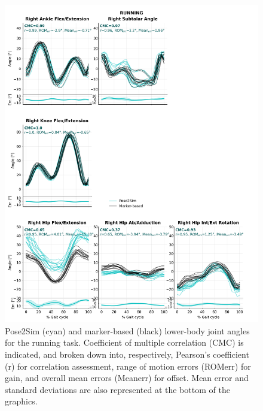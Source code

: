 \begin{figure}[!ht]
	\centering
	\def\svgwidth{1\columnwidth}
	\fontsize{10pt}{10pt}\selectfont
	\includegraphics[width=.94\linewidth]{"../Annexes/Figures/Fig_QTMRun.png"}
	\caption{Pose2Sim (cyan) and marker-based (black) lower-body joint angles for the running task. Coefficient of multiple correlation (CMC) is indicated, and broken down into, respectively, Pearson’s coefficient (r) for correlation assessment, range of motion errors (ROMerr) for gain, and overall mean errors (Meanerr) for offset. Mean error and standard deviations are also represented at the bottom of the graphics.}
	\label{fig_qtmrun}
\end{figure}

